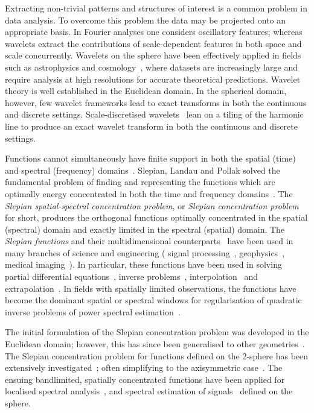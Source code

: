 Extracting non-trivial patterns and structures of interest is a common problem in data analysis.
To overcome this problem the data may be projected onto an appropriate basis.
In Fourier analyses one considers oscillatory features; whereas wavelets extract the contributions of scale-dependent features in both space and scale concurrently.
Wavelets on the sphere have been effectively applied in fields such as astrophysics and cosmology~\autocite{Pen1999,Barreiro2001,Rocha2004,McEwen2004}, where datasets are increasingly large and require analysis at high resolutions for accurate theoretical predictions.
Wavelet theory is well established in the Euclidean domain.
In the spherical domain, however, few wavelet frameworks lead to exact transforms in both the continuous and discrete settings.
Scale-discretised wavelets~\autocite{Wiaux2008,McEwen2018,Leistedt2013,McEwen2013,McEwen2015} lean on a tiling of the harmonic line to produce an exact wavelet transform in both the continuous and discrete settings.

Functions cannot simultaneously have finite support in both the spatial (time) and spectral (frequency) domains~\autocite{Slepian1961,Slepian1983}.
Slepian, Landau and Pollak solved the fundamental problem of finding and representing the functions which are optimally energy concentrated in both the time and frequency domains~\autocite{Slepian1961,Landau1961,Landau1962}.
The \emph{Slepian spatial-spectral concentration problem}, or \emph{Slepian concentration problem} for short, produces the orthogonal functions optimally concentrated in the spatial (spectral) domain and exactly limited in the spectral (spatial) domain.
The \emph{Slepian functions} and their multidimensional counterparts~\autocite{Slepian1964,Simons2011a} have been used in many branches of science and engineering (\eg{} signal processing~\autocite{Mathews1985,Thomson1982}, geophysics~\autocite{Thomson1976,Simons2006a,Simons2011}, medical imaging~\autocite{Jackson1991}).
In particular, these functions have been used in solving partial differential equations~\autocite{Boyd2003,Chen2005}, inverse problems~\autocite{Villiers2001,Abdelmoula2015}, interpolation~\autocite{Moore2004,Shkolnisky2006} and extrapolation~\autocite{Xu1983}.
In fields with spatially limited observations, the functions have become the dominant spatial or spectral windows for regularisation of quadratic inverse problems of power spectral estimation~\autocite{Thomson1976}.

The initial formulation of the Slepian concentration problem was developed in the Euclidean domain; however, this has since been generalised to other geometries~\autocite{Simons2006,Wieczorek2005,Albertella1999,Cohen1989,Meaney1984,Daubechies1988}.
The Slepian concentration problem for functions defined on the 2-sphere has been extensively investigated~\autocite{Simons2006,Wieczorek2005,Albertella1999}; often simplifying to the axisymmetric case~\autocite{Simons2006a,Simons2013}.
The ensuing bandlimited, spatially concentrated functions have been applied for localised spectral analysis~\autocite{Wieczorek2005}, and spectral estimation of signals~\autocite{Wieczorek2007} defined on the sphere.

